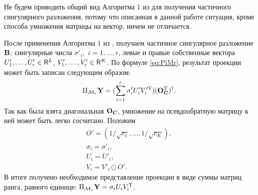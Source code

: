 \documentclass[12pt, specialist, subf,href,colorlinks=true,substylefile = spbu.rtx]{disser}
\theoremstyle{remark}
\theoremstyle{definition}
\begin{document}
Не будем приводить общий вид Алгоритма 1 из \cite{Korobeynikov2010} для получения частичного сингулярного разложения, потому что описанная в данной работе ситуация, кроме способа умножения матрицы на вектор, ничем не отличается.

После применения Алгоритма 1 из \cite{Korobeynikov2010}, получаем частичное сингулярное разложение $\mathbf{B}$: сингулярные числа $\sigma'_i,$ $i = 1, \ldots, r$, левые и правые собственные вектора $U'_1, \ldots, U'_r \in \mathsf{R}^L$, $V'_1, \ldots, V'_r \in \mathsf{R}^K$. По формуле \eqref{eq:PiMr}, результат проекции может быть записан следующим образом:
\begin{equation*}
\Pi_{\mathcal{M}_r} \mathbf{Y} = (\sum\limits_{i=1}^r \sigma'_i U'_i V_i'^{\mathrm{T}}) (\mathbf{O}_{\mathbf{C}}^{\mathrm{T}})^\dagger.
\end{equation*}
Так как была взята диагональная $\mathbf{O}_{\mathbf{C}}$, умножение на псевдообратную матрицу к ней может быть легко сосчитано. Положим
\begin{gather*}
O' = (1/\sqrt{c_1}, \ldots, 1/\sqrt{c_K}), \\
\sigma_i = \sigma'_i, \\
U_i = U'_i, \\
V_i = V'_i \odot O'.
\end{gather*}
В итоге получено необходимое представление проекции в виде суммы матриц ранга, равного единице:
$\Pi_{\mathcal{M}_r} \mathbf{Y} = \sigma_i U_i V_i^{\mathrm{T}}$.
\end{document}
